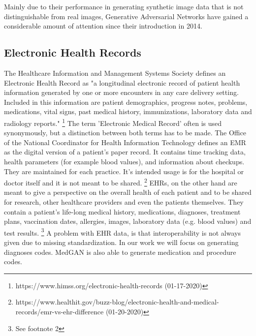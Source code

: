 \documentclass[11pt, a4paper, oneside]{book}
\begin{document}
Mainly due to their performance in generating synthetic image data that is not distinguishable from real images, Generative Adversarial Networks have gained a considerable amount of attention since their introduction in 2014.


\subsection{Electronic Health Records}
The Healthcare Information and Management Systems Society defines an Electronic Health Record as "a longitudinal electronic record of patient health information generated by one or more encounters in any care delivery setting. Included in this information are patient demographics, progress notes, problems, medications, vital signs, past medical history, immunizations, laboratory data and radiology reports." \footnote{https://www.himss.org/electronic-health-records (01-17-2020)}
The term 'Electronic Medical Record' often is used synonymously, but a distinction between both terms has to be made.
The Office of the National Coordinator for Health Information Technology defines an EMR as the digital version of a patient's paper record. It contains time tracking data, health parameters (for example blood values), and information about checkups. They are maintained for each practice. It's intended usage is for the hospital or doctor itself and it is not meant to be shared. \footnote{https://www.healthit.gov/buzz-blog/electronic-health-and-medical-records/emr-vs-ehr-difference (01-20-2020)}
EHRs, on the other hand are meant to give a perspective on the overall health of each patient and to be shared for research, other healthcare providers and even the patients themselves. They contain a patient's life-long medical history, medications, diagnoses, treatment plans, vaccination dates, allergies, images, laboratory data (e.g. blood values) and test results. \footnote{See footnote 2} A problem with EHR data, is that interoperability is not always given due to missing standardization. \citep{johnson2016mimic}
In our work we will focus on generating diagnoses codes. MedGAN is also able to generate medication and procedure codes.
\end{document}
